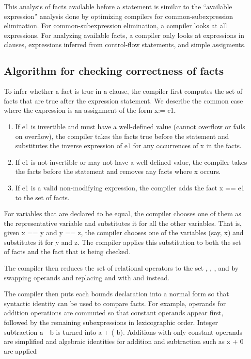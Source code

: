 This analysis of facts available before a statement is similar to the
``available expression'' analysis done by optimizing compilers for
common-subexpression elimination. For common-subexpression elimination,
a compiler looks at all expressions. For analyzing available facts, a
compiler only looks at expressions in  clauses, expressions
inferred from control-flow statements, and simple assigments.

\subsection{Algorithm for checking correctness of facts}

To infer whether a fact is true in a  clause, the compiler first
computes the set of facts that are true after the expression statement.
We describe the common case where the expression is an assignment of the
form x:= e1.

\begin{enumerate}
\item
  If e1 is invertible and must have a well-defined value (cannot
  overflow or fails on overflow), the compiler takes the facts true
  before the statement and substitutes the inverse expression of e1 for
  any occurrences of x in the facts.
\item
  If e1 is not invertible or may not have a well-defined value, the
  compiler takes the facts before the statement and removes any facts
  where x occurs.
\item
  If e1 is a valid non-modifying expression, the compiler adds the fact
  x == e1 to the set of facts.
\end{enumerate}

For variables that are declared to be equal, the compiler chooses one of
them as the representative variable and substitutes it for all the other
variables. That is, given x == y and y == z, the compiler chooses one of
the variables (say, x) and substitutes it for y and z. The compiler
applies this substitution to both the set of facts and the fact that is
being checked.

The compiler then reduces the set of relational operators to the set
\code{<}, \code{<=}, \code{==}, and \code{!=}
by swapping operands and replacing \code{>} and \code{>=} 
with \code{<=} and \code{<} instead.

The compiler then puts each bounds declaration into a normal form so
that syntactic identity can be used to compare facts. For example,
operands for addition operations are commuted so that constant operands
appear first, followed by the remaining subexpressions in lexicographic
order. Integer subtraction a - b is turned into a + (-b). Additions
with only constant operands are simplified and algebraic identities for
addition and subtraction such as x + 0 are applied

